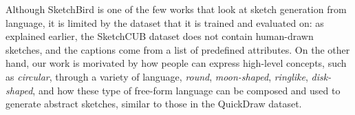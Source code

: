 Although SketchBird is one of the few works that look at sketch generation from language, it is limited by the dataset that it is trained and evaluated on: as explained earlier, the SketchCUB dataset does not contain human-drawn sketches, and the captions come from a list of predefined attributes. On the other hand, our work is morivated by how people can express high-level concepts, such as \textit{circular}, through a variety of language, \textit{round}, \textit{moon-shaped}, \textit{ringlike}, \textit{disk-shaped}, and how these type of free-form language can be composed and used to generate abstract sketches, similar to those in the QuickDraw dataset.     





